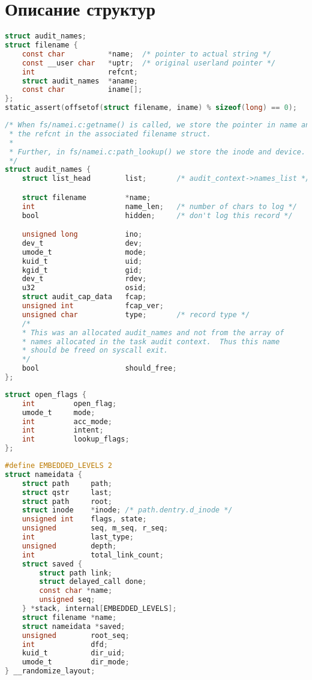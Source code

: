 \chapter{Описание структур}

\begin{lstlisting}[language=C]
struct audit_names;
struct filename {
	const char			*name;	/* pointer to actual string */
	const __user char	*uptr;	/* original userland pointer */
	int					refcnt;
	struct audit_names	*aname;
	const char			iname[];
};
static_assert(offsetof(struct filename, iname) % sizeof(long) == 0);
\end{lstlisting}

\begin{lstlisting}[language=C]
/* When fs/namei.c:getname() is called, we store the pointer in name and bump
 * the refcnt in the associated filename struct.
 *
 * Further, in fs/namei.c:path_lookup() we store the inode and device.
 */
struct audit_names {
	struct list_head		list;		/* audit_context->names_list */

	struct filename			*name;
	int						name_len;	/* number of chars to log */
	bool					hidden;		/* don't log this record */

	unsigned long			ino;
	dev_t					dev;
	umode_t					mode;
	kuid_t					uid;
	kgid_t					gid;
	dev_t					rdev;
	u32						osid;
	struct audit_cap_data	fcap;
	unsigned int			fcap_ver;
	unsigned char			type;		/* record type */
	/*
	* This was an allocated audit_names and not from the array of
	* names allocated in the task audit context.  Thus this name
	* should be freed on syscall exit.
	*/
	bool					should_free;
};   
\end{lstlisting}

\clearpage

\begin{lstlisting}[language=C]
struct open_flags {
	int 		open_flag;
	umode_t 	mode;
	int 		acc_mode;
	int 		intent;
	int 		lookup_flags;
};
\end{lstlisting}

\begin{lstlisting}[language=C]
#define EMBEDDED_LEVELS 2
struct nameidata {
	struct path		path;
	struct qstr		last;
	struct path		root;
	struct inode	*inode; /* path.dentry.d_inode */
	unsigned int	flags, state;
	unsigned		seq, m_seq, r_seq;
	int				last_type;
	unsigned		depth;
	int				total_link_count;
	struct saved {
		struct path link;
		struct delayed_call done;
		const char *name;
		unsigned seq;
	} *stack, internal[EMBEDDED_LEVELS];
	struct filename	*name;
	struct nameidata *saved;
	unsigned		root_seq;
	int				dfd;
	kuid_t			dir_uid;
	umode_t			dir_mode;
} __randomize_layout;
\end{lstlisting}


